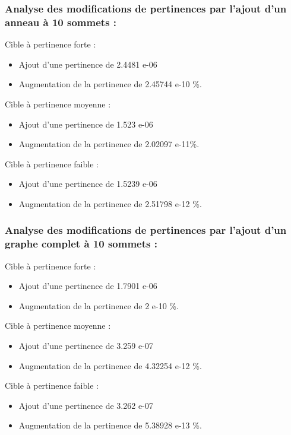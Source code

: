 \documentclass[a4paper,11pt]{article}
\begin{document}
		\subsubsection{Analyse des modifications de pertinences par l'ajout d'un anneau à 10 sommets :}
			Cible à pertinence forte :
			\begin{itemize} 	
				\item Ajout d'une pertinence de 2.4481 e-06
				\item Augmentation de la pertinence de 2.45744 e-10 \%.
			\end{itemize}
			Cible à pertinence moyenne :
			\begin{itemize} 	
				\item Ajout d'une pertinence de 1.523 e-06
				\item Augmentation de la pertinence de 2.02097 e-11\%.
			\end{itemize}
			Cible à pertinence faible :
			\begin{itemize} 	
				\item Ajout d'une pertinence de 1.5239 e-06
				\item Augmentation de la pertinence de 2.51798 e-12 \%.
			\end{itemize}

		\subsubsection{Analyse des modifications de pertinences par l'ajout d'un graphe complet à 10 sommets :}
			Cible à pertinence forte :
			\begin{itemize} 	
				\item Ajout d'une pertinence de 1.7901 e-06
				\item Augmentation de la pertinence de 2 e-10 \%.
			\end{itemize}
			Cible à pertinence moyenne :
			\begin{itemize} 	
				\item Ajout d'une pertinence de 3.259 e-07
				\item Augmentation de la pertinence de 4.32254 e-12 \%.
			\end{itemize}
			Cible à pertinence faible :
			\begin{itemize} 	
				\item Ajout d'une pertinence de 3.262 e-07
				\item Augmentation de la pertinence de 5.38928 e-13 \%.
			\end{itemize}
\end{document}
